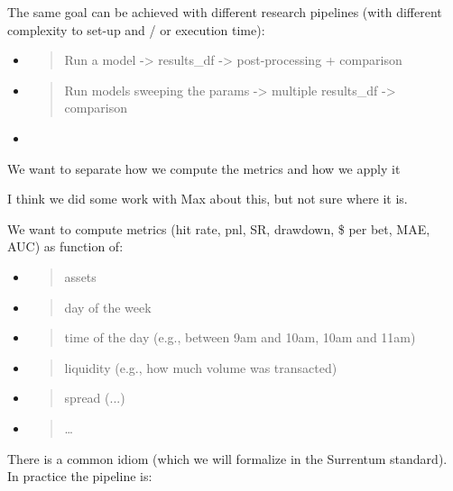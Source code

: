 \documentclass[11pt, reqno]{amsart}
\begin{document}
The same goal can be achieved with different research pipelines (with
different complexity to set-up and / or execution time):

\begin{itemize}
\item
  \begin{quote}
  Run a model -\textgreater{} results\_df -\textgreater{}
  post-processing + comparison
  \end{quote}
\item
  \begin{quote}
  Run models sweeping the params -\textgreater{} multiple results\_df
  -\textgreater{} comparison
  \end{quote}
\item
\end{itemize}

We want to separate how we compute the metrics and how we apply it

I think we did some work with Max about this, but not sure where it is.

We want to compute metrics (hit rate, pnl, SR, drawdown, \$ per bet,
MAE, AUC) as function of:

\begin{itemize}
\item
  \begin{quote}
  assets
  \end{quote}
\item
  \begin{quote}
  day of the week
  \end{quote}
\item
  \begin{quote}
  time of the day (e.g., between 9am and 10am, 10am and 11am)
  \end{quote}
\item
  \begin{quote}
  liquidity (e.g., how much volume was transacted)
  \end{quote}
\item
  \begin{quote}
  spread (...)
  \end{quote}
\item
  \begin{quote}
  \ldots{}
  \end{quote}
\end{itemize}

There is a common idiom (which we will formalize in the Surrentum
standard). In practice the pipeline is:
\end{document}
